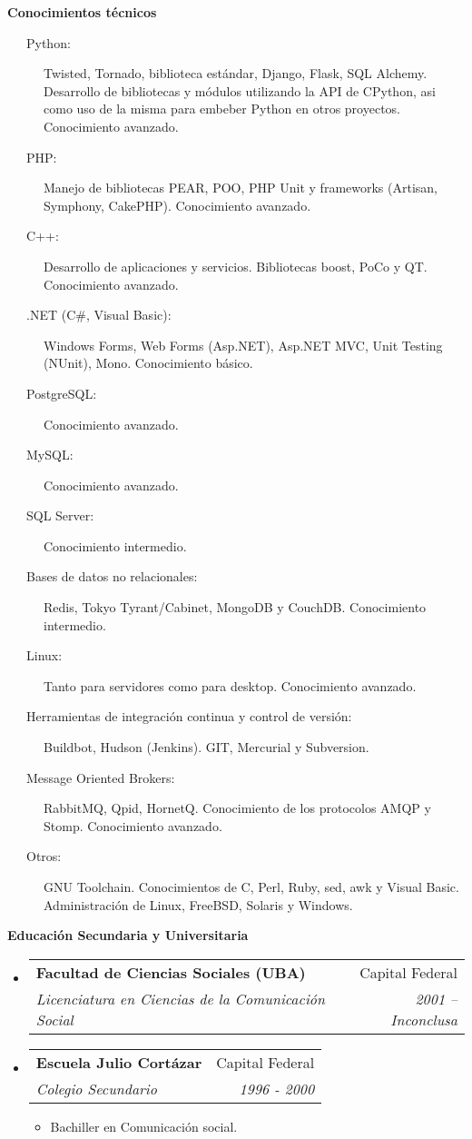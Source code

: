 \documentclass[a4paper,11pt]{article}
\makeatletter
\newcommand{\resitem}[1]{\item #1 \vspace{-2pt}}
\newcommand{\resheading}[1]{{\large \colorbox{mygrey}{\begin{minipage}{\textwidth}{\textbf{#1 \vphantom{p\^{E}}}}\end{minipage}}}}
\newcommand{\ressubheading}[4]{
\begin{tabular*}{6.3in}{l@{\extracolsep{\fill}}r}
		\textbf{#1} & #2 \\
		\textit{#3} & \textit{#4} \\
\end{tabular*}\vspace{-6pt}}
\makeatother
\begin{document}
\resheading{ Conocimientos t\'ecnicos }
	\begin{description}
		\item[\ \ \ Python:] { \footnotesize Twisted, Tornado, biblioteca est\'andar, Django, Flask, SQL Alchemy. Desarrollo de bibliotecas y m\'odulos utilizando la API de CPython, asi como uso de la misma para embeber Python en otros proyectos. Conocimiento avanzado. }
		\item[\ \ \ PHP:] { \footnotesize Manejo de bibliotecas PEAR, POO, PHP Unit y frameworks (Artisan, Symphony, CakePHP).  Conocimiento avanzado. }
		\item[\ \ \ C++:] { \footnotesize Desarrollo de aplicaciones y servicios. Bibliotecas boost, PoCo y QT. Conocimiento avanzado. }
		\item[\ \ \ .NET (C\#, Visual Basic):] { \footnotesize Windows Forms, Web Forms (Asp.NET), Asp.NET MVC, Unit Testing (NUnit), Mono. Conocimiento b\'asico. }
		\item[\ \ \ PostgreSQL:] { \footnotesize Conocimiento avanzado. }
		\item[\ \ \ MySQL:] { \footnotesize Conocimiento avanzado. }
		\item[\ \ \ SQL Server:] { \footnotesize Conocimiento intermedio. }
		\item[\ \ \ Bases de datos no relacionales:] { \footnotesize Redis, Tokyo Tyrant/Cabinet, MongoDB y CouchDB. Conocimiento intermedio. }
		\item[\ \ \ Linux:] { \footnotesize Tanto para servidores como para desktop. Conocimiento avanzado. }
		\item[\ \ \ Herramientas de integraci\'on continua y control de versi\'on:] { \footnotesize Buildbot, Hudson (Jenkins). GIT, Mercurial y Subversion. }
		\item[\ \ \ Message Oriented Brokers:] { \footnotesize RabbitMQ, Qpid, HornetQ. Conocimiento de los protocolos AMQP y Stomp. Conocimiento avanzado. }
		\item[\ \ \ Otros:] { \footnotesize GNU Toolchain. Conocimientos de C, Perl, Ruby, sed, awk y Visual Basic. Administraci\'on de Linux, FreeBSD, Solaris y Windows. }
	\end{description}
	

\resheading{Educaci\'on Secundaria y Universitaria}
	\begin{itemize}
		\item                                                                                                                                                                                     
			\ressubheading{Facultad de Ciencias Sociales (UBA)} {Capital Federal} {Licenciatura en Ciencias de la Comunicaci\'on Social} {2001 -- Inconclusa}
				{ \footnotesize }
		\item
			\ressubheading{Escuela Julio Cort\'azar} {Capital Federal} {Colegio Secundario} {1996 - 2000}
				{ \footnotesize
				\begin{itemize}
					\resitem[\ \ \ Titulo obtenido:]{ Bachiller en Comunicaci\'on social. }
				\end{itemize}
				}
	\end{itemize}
\end{document}
